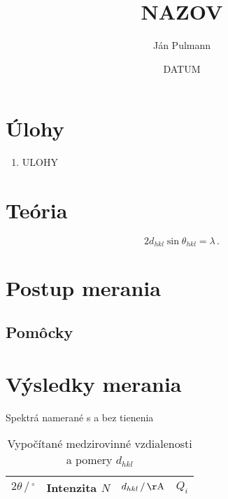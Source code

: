 \documentclass[a4paper, 10pt]{article}
\newcommand{\unit}[1]{\ensuremath{\, \mathrm{#1}}}
\begin{document}
\title{NAZOV}
\author{Ján Pulmann}
\date{DATUM}
\maketitle
\section*{Úlohy}
\begin{enumerate}

	\item ULOHY
 \end{enumerate}
 
\section*{Teória}
\begin{equation}
\label{eq:teor:bragg}
2 d_{hkl} \sin\theta_{hkl} = \lambda\,.
\end{equation}
\section*{Postup merania}
\subsection*{Pomôcky}
\section*{Výsledky merania}

\begin{graph}[h!]
\centering
\vspace*{-15pt}
\caption{ Spektrá namerané s a bez tienenia \label{graph:spektrum}}
\end{graph}


\begin{table}[h!]
\centering
\hspace*{30pt}
\begin{tabular}{c|c|c|c}
$ 2\theta \,/\,^\circ $ & 
Intenzita $N$ &
$ d_{hkl}\,/\unit{\AA}$ & 
$ Q_i$ 
\\
\midrule 
\end{tabular}
\newline
\vspace*{2pt}
\caption{Vypočítané medzirovinné vzdialenosti a pomery $d_{hkl}$\label{tab:Qi_merane}}
\end{table}
\end{document}
